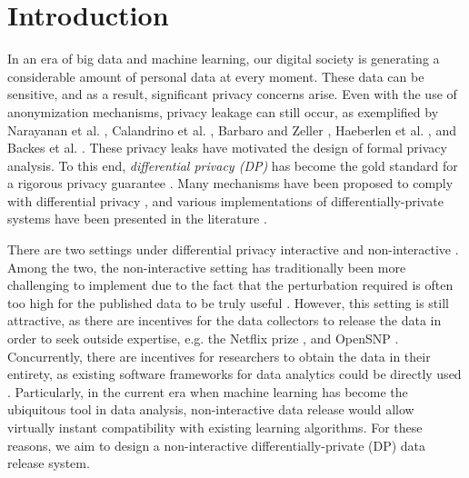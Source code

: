\documentclass[USenglish,oneside,twocolumn]{article}
\theoremstyle{definition}
\theoremstyle{remark}
\theoremstyle{plain}
\theoremstyle{plain}
\begin{document}

 

\maketitle

\section{Introduction}

In an era of big data and machine learning, our digital society is
generating a considerable amount of personal data at every moment.
These data can be sensitive, and as a result, significant privacy
concerns arise. Even with the use of anonymization mechanisms, privacy
leakage can still occur, as exemplified by Narayanan et al. \cite{RefWorks:181},
Calandrino et al. \cite{RefWorks:182}, Barbaro and Zeller \cite{RefWorks:183},
Haeberlen et al. \cite{RefWorks:260}, and Backes et al. \cite{RefWorks:262}.
These privacy leaks have motivated the design of formal privacy analysis.
To this end, \emph{differential privacy (DP)} has become the gold
standard for a rigorous privacy guarantee \cite{RefWorks:151,RefWorks:185,RefWorks:186,RefWorks:194,RefWorks:195}.
Many mechanisms have been proposed to comply with differential privacy \cite{RefWorks:193,RefWorks:194,RefWorks:188,RefWorks:185,RefWorks:195,RefWorks:192,RefWorks:220,RefWorks:221,RefWorks:222,RefWorks:224,RefWorks:246},
and various implementations of differentially-private systems have
been presented in the literature \cite{RefWorks:254,RefWorks:255,RefWorks:256,RefWorks:257,RefWorks:258,RefWorks:261,RefWorks:265,RefWorks:379,blocki2016differentially,RefWorks:449}.

There are two settings under differential privacy \textendash{} interactive
and non-interactive \cite{RefWorks:151}. Among the two, the non-interactive
setting has traditionally been more challenging to implement due to
the fact that the perturbation required is often too high for the
published data to be truly useful \cite{RefWorks:381,RefWorks:336,RefWorks:527,RefWorks:530}.
However, this setting is still attractive, as there are incentives
for the data collectors to release the data in order to seek outside
expertise, e.g. the Netflix prize \cite{RefWorks:377}, and OpenSNP
\cite{RefWorks:378}. Concurrently, there are incentives for researchers
to obtain the data in their entirety, as existing software frameworks
for data analytics could be directly used \cite{RefWorks:336,RefWorks:372}.
Particularly, in the current era when machine learning has become
the ubiquitous tool in data analysis, non-interactive data release
would allow virtually instant compatibility with existing 
learning algorithms. For these reasons, we aim to design a
non-interactive differentially-private (DP) data release system.
\end{document}

